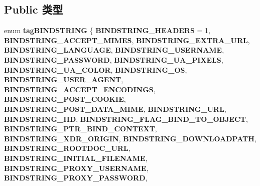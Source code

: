 \subsection*{Public 类型}
\begin{DoxyCompactItemize}
\item 
\mbox{\label{interface_i_internet_bind_info_adf967b21f4a84be2108369a28bbfc8bd}} 
enum {\bfseries tag\+B\+I\+N\+D\+S\+T\+R\+I\+NG} \{ \newline
{\bfseries B\+I\+N\+D\+S\+T\+R\+I\+N\+G\+\_\+\+H\+E\+A\+D\+E\+RS} = 1, 
{\bfseries B\+I\+N\+D\+S\+T\+R\+I\+N\+G\+\_\+\+A\+C\+C\+E\+P\+T\+\_\+\+M\+I\+M\+ES}, 
{\bfseries B\+I\+N\+D\+S\+T\+R\+I\+N\+G\+\_\+\+E\+X\+T\+R\+A\+\_\+\+U\+RL}, 
{\bfseries B\+I\+N\+D\+S\+T\+R\+I\+N\+G\+\_\+\+L\+A\+N\+G\+U\+A\+GE}, 
\newline
{\bfseries B\+I\+N\+D\+S\+T\+R\+I\+N\+G\+\_\+\+U\+S\+E\+R\+N\+A\+ME}, 
{\bfseries B\+I\+N\+D\+S\+T\+R\+I\+N\+G\+\_\+\+P\+A\+S\+S\+W\+O\+RD}, 
{\bfseries B\+I\+N\+D\+S\+T\+R\+I\+N\+G\+\_\+\+U\+A\+\_\+\+P\+I\+X\+E\+LS}, 
{\bfseries B\+I\+N\+D\+S\+T\+R\+I\+N\+G\+\_\+\+U\+A\+\_\+\+C\+O\+L\+OR}, 
\newline
{\bfseries B\+I\+N\+D\+S\+T\+R\+I\+N\+G\+\_\+\+OS}, 
{\bfseries B\+I\+N\+D\+S\+T\+R\+I\+N\+G\+\_\+\+U\+S\+E\+R\+\_\+\+A\+G\+E\+NT}, 
{\bfseries B\+I\+N\+D\+S\+T\+R\+I\+N\+G\+\_\+\+A\+C\+C\+E\+P\+T\+\_\+\+E\+N\+C\+O\+D\+I\+N\+GS}, 
{\bfseries B\+I\+N\+D\+S\+T\+R\+I\+N\+G\+\_\+\+P\+O\+S\+T\+\_\+\+C\+O\+O\+K\+IE}, 
\newline
{\bfseries B\+I\+N\+D\+S\+T\+R\+I\+N\+G\+\_\+\+P\+O\+S\+T\+\_\+\+D\+A\+T\+A\+\_\+\+M\+I\+ME}, 
{\bfseries B\+I\+N\+D\+S\+T\+R\+I\+N\+G\+\_\+\+U\+RL}, 
{\bfseries B\+I\+N\+D\+S\+T\+R\+I\+N\+G\+\_\+\+I\+ID}, 
{\bfseries B\+I\+N\+D\+S\+T\+R\+I\+N\+G\+\_\+\+F\+L\+A\+G\+\_\+\+B\+I\+N\+D\+\_\+\+T\+O\+\_\+\+O\+B\+J\+E\+CT}, 
\newline
{\bfseries B\+I\+N\+D\+S\+T\+R\+I\+N\+G\+\_\+\+P\+T\+R\+\_\+\+B\+I\+N\+D\+\_\+\+C\+O\+N\+T\+E\+XT}, 
{\bfseries B\+I\+N\+D\+S\+T\+R\+I\+N\+G\+\_\+\+X\+D\+R\+\_\+\+O\+R\+I\+G\+IN}, 
{\bfseries B\+I\+N\+D\+S\+T\+R\+I\+N\+G\+\_\+\+D\+O\+W\+N\+L\+O\+A\+D\+P\+A\+TH}, 
{\bfseries B\+I\+N\+D\+S\+T\+R\+I\+N\+G\+\_\+\+R\+O\+O\+T\+D\+O\+C\+\_\+\+U\+RL}, 
\newline
{\bfseries B\+I\+N\+D\+S\+T\+R\+I\+N\+G\+\_\+\+I\+N\+I\+T\+I\+A\+L\+\_\+\+F\+I\+L\+E\+N\+A\+ME}, 
{\bfseries B\+I\+N\+D\+S\+T\+R\+I\+N\+G\+\_\+\+P\+R\+O\+X\+Y\+\_\+\+U\+S\+E\+R\+N\+A\+ME}, 
{\bfseries B\+I\+N\+D\+S\+T\+R\+I\+N\+G\+\_\+\+P\+R\+O\+X\+Y\+\_\+\+P\+A\+S\+S\+W\+O\+RD}, 

\end{DoxyCompactItemize}
